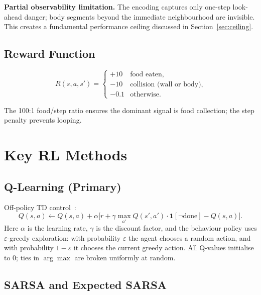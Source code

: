 \documentclass[10pt,conference]{IEEEtran}
\begin{document}
\textbf{Partial observability limitation.}
The encoding captures only one-step look-ahead danger; body segments
beyond the immediate neighbourhood are invisible.
This creates a fundamental performance ceiling discussed in
Section~\ref{sec:ceiling}.

\subsection{Reward Function}

\begin{equation}
  R(s,a,s') =
  \begin{cases}
    +10 & \text{food eaten,}\\
    -10 & \text{collision (wall or body),}\\
    -0.1 & \text{otherwise.}
  \end{cases}
\end{equation}

The 100:1 food/step ratio ensures the dominant signal is food
collection; the step penalty prevents looping.

\section{Key RL Methods}
\label{sec:methods}

\subsection{Q-Learning (Primary)}

Off-policy TD control~\cite{watkins1992q}:
\begin{equation}
  Q(s,a)\leftarrow Q(s,a)+\alpha\bigl[
    r + \gamma\max_{a'}Q(s',a')\cdot\mathbf{1}[\neg\text{done}]
    -Q(s,a)\bigr].
  \label{eq:ql}
\end{equation}
Here $\alpha$ is the learning rate, $\gamma$ is the discount factor,
and the behaviour policy uses $\varepsilon$-greedy exploration:
with probability $\varepsilon$ the agent chooses a random action, and
with probability $1-\varepsilon$ it chooses the current greedy action.
All Q-values initialise to 0; ties in $\arg\max$ are broken
uniformly at random.

\subsection{SARSA and Expected SARSA}
\end{document}
